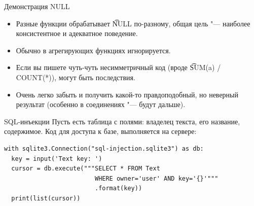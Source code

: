 \begin{frame}{Демонстрация NULL}
    \begin{itemize}
    	\item Разные функции обрабатывает \t{NULL} по-разному, общая цель "--- наиболее консистентное и адекватное поведение.
    	\item Обычно в агрегирующих функциях игнорируется.
    	\item Если вы пишете чуть-чуть несимметричный код (вроде \t{SUM(a) / COUNT(*)}), могут быть последствия.
    	\item Очень легко забыть и получить какой-то правдоподобный, но неверный результат (особенно в соединениях "--- будут дальше).
    \end{itemize}
\end{frame}

\begin{frame}[t,fragile]{SQL-инъекции}
	Пусть есть таблица с полями: владелец текста, его название, содержимое.
	Код для доступа к базе, выполняется на сервере:
\begin{verbatim}
with sqlite3.Connection("sql-injection.sqlite3") as db:
  key = input('Text key: ')
  cursor = db.execute("""SELECT * FROM Text
                         WHERE owner='user' AND key='{}'"""
                         .format(key))
  print(list(cursor))
\end{verbatim}
\end{frame}

